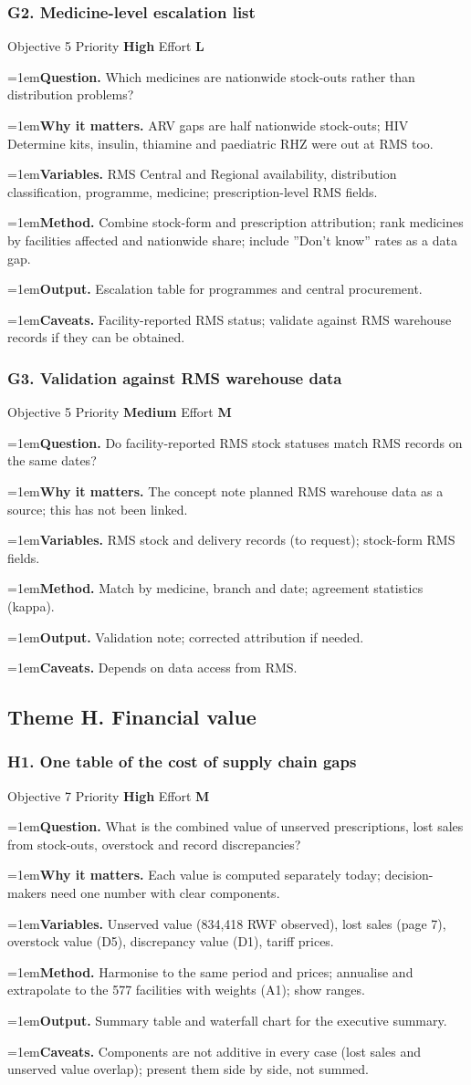 \documentclass[10pt,a4paper]{article}
\newcommand{\field}[2]{\par\hangindent=1em\textbf{#1.} #2}
\begin{document}
\subsubsection*{G2. Medicine-level escalation list}
{\footnotesize\color{gray} Objective 5 \textperiodcentered{} Priority \textbf{High} \textperiodcentered{} Effort \textbf{L}}
\field{Question}{Which medicines are nationwide stock-outs rather than distribution problems?}
\field{Why it matters}{ARV gaps are half nationwide stock-outs; HIV Determine kits, insulin, thiamine and paediatric RHZ were out at RMS too.}
\field{Variables}{RMS Central and Regional availability, distribution classification, programme, medicine; prescription-level RMS fields.}
\field{Method}{Combine stock-form and prescription attribution; rank medicines by facilities affected and nationwide share; include ''Don't know'' rates as a data gap.}
\field{Output}{Escalation table for programmes and central procurement.}
\field{Caveats}{Facility-reported RMS status; validate against RMS warehouse records if they can be obtained.}
\subsubsection*{G3. Validation against RMS warehouse data}
{\footnotesize\color{gray} Objective 5 \textperiodcentered{} Priority \textbf{Medium} \textperiodcentered{} Effort \textbf{M}}
\field{Question}{Do facility-reported RMS stock statuses match RMS records on the same dates?}
\field{Why it matters}{The concept note planned RMS warehouse data as a source; this has not been linked.}
\field{Variables}{RMS stock and delivery records (to request); stock-form RMS fields.}
\field{Method}{Match by medicine, branch and date; agreement statistics (kappa).}
\field{Output}{Validation note; corrected attribution if needed.}
\field{Caveats}{Depends on data access from RMS.}
\subsection{Theme H. Financial value}
\subsubsection*{H1. One table of the cost of supply chain gaps}
{\footnotesize\color{gray} Objective 7 \textperiodcentered{} Priority \textbf{High} \textperiodcentered{} Effort \textbf{M}}
\field{Question}{What is the combined value of unserved prescriptions, lost sales from stock-outs, overstock and record discrepancies?}
\field{Why it matters}{Each value is computed separately today; decision-makers need one number with clear components.}
\field{Variables}{Unserved value (834,418 RWF observed), lost sales (page 7), overstock value (D5), discrepancy value (D1), tariff prices.}
\field{Method}{Harmonise to the same period and prices; annualise and extrapolate to the 577 facilities with weights (A1); show ranges.}
\field{Output}{Summary table and waterfall chart for the executive summary.}
\field{Caveats}{Components are not additive in every case (lost sales and unserved value overlap); present them side by side, not summed.}
\end{document}
